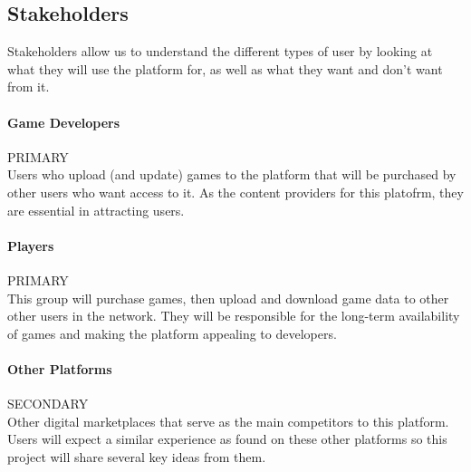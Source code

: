 
\subsection{Stakeholders}

Stakeholders allow us to understand the different types of user by looking at what they will use the platform for, as well as what they want and don't want from it.

\newcommand{\primary}{\hspace*{\fill}PRIMARY\\}
\newcommand{\secondary}{\hspace*{\fill}SECONDARY\\}
\newcommand{\tertiary}{\hspace*{\fill}TERTIARY\\}

\paragraph*{Game Developers}\primary
Users who upload (and update) games to the platform that will be purchased by other users who want access to it. As the content providers for this platofrm, they are essential in attracting users.

\paragraph*{Players}\primary
This group will purchase games, then upload and download game data to other other users in the network. They will be responsible for the long-term availability of games and making the platform appealing to developers.

\paragraph*{Other Platforms}\secondary
Other digital marketplaces that serve as the main competitors to this platform. Users will expect a similar experience as found on these other platforms so this project will share several key ideas from them.